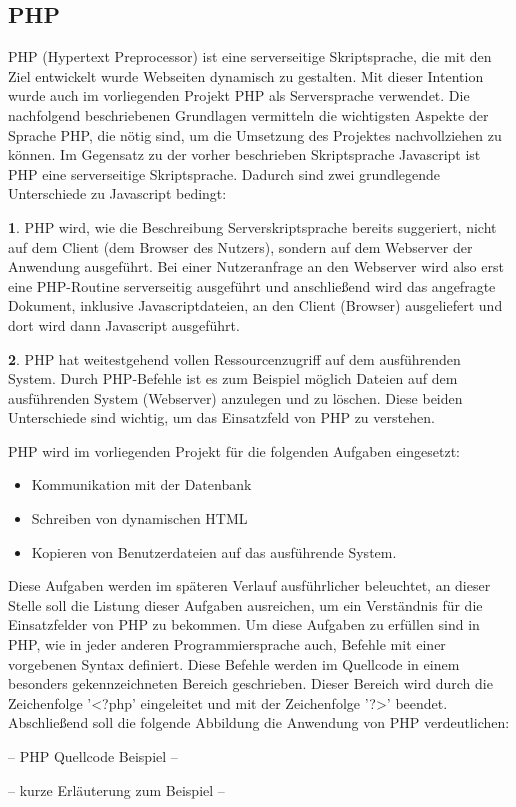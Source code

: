 \subsection{PHP}
\label{sec:Php}

PHP (Hypertext Preprocessor) ist eine serverseitige Skriptsprache, die mit den Ziel entwickelt wurde Webseiten dynamisch
zu gestalten.
Mit dieser Intention wurde auch im vorliegenden Projekt PHP als Serversprache verwendet. Die nachfolgend beschriebenen
Grundlagen vermitteln die wichtigsten Aspekte der Sprache PHP, die nötig sind, um die Umsetzung des Projektes
nachvollziehen zu können.
Im Gegensatz zu der vorher beschrieben Skriptsprache Javascript ist PHP eine serverseitige Skriptsprache. Dadurch sind
zwei grundlegende Unterschiede zu Javascript bedingt:

\textbf{1}. PHP wird, wie die Beschreibung Serverskriptsprache bereits suggeriert, nicht auf dem Client (dem Browser des Nutzers),
sondern auf dem Webserver der Anwendung ausgeführt. Bei einer Nutzeranfrage an den Webserver wird also erst eine PHP-Routine serverseitig ausgeführt und anschließend wird das angefragte Dokument, inklusive
Javascriptdateien, an den Client (Browser) ausgeliefert und dort wird dann Javascript ausgeführt.

\textbf{2}. PHP hat weitestgehend vollen Ressourcenzugriff auf dem ausführenden System. Durch PHP-Befehle ist es zum Beispiel möglich Dateien auf dem ausführenden System (Webserver) anzulegen und zu löschen.
Diese beiden Unterschiede sind wichtig, um das Einsatzfeld von PHP zu verstehen.

PHP wird im vorliegenden Projekt für die folgenden Aufgaben eingesetzt:
\begin{itemize}
  \item Kommunikation mit der Datenbank
  \item Schreiben von dynamischen HTML
  \item Kopieren von Benutzerdateien auf das ausführende System.
\end{itemize}

Diese Aufgaben werden im späteren Verlauf ausführlicher beleuchtet, an dieser Stelle soll die Listung dieser Aufgaben
ausreichen, um ein Verständnis für die Einsatzfelder von PHP zu bekommen.
Um diese Aufgaben zu erfüllen sind in PHP, wie in jeder anderen Programmiersprache auch, Befehle mit einer vorgebenen
Syntax definiert. Diese Befehle werden im Quellcode in einem besonders gekennzeichneten Bereich geschrieben. Dieser
Bereich wird durch die Zeichenfolge '<?php' eingeleitet und mit der Zeichenfolge '?>' beendet.
Abschließend soll die folgende Abbildung die Anwendung von PHP verdeutlichen:

-- PHP Quellcode Beispiel --

-- kurze Erläuterung zum Beispiel --
